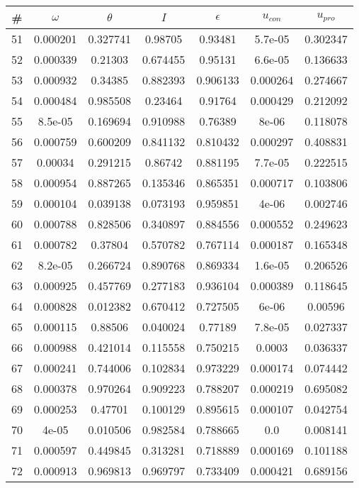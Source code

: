 \newpage
\begin{table}
\begin{tabular}{c|c|c|c|c|c|c}
\# & $\omega$ & $\theta$ & $I$ & $\epsilon$ & $u_{con}$ & $u_{pro}$\\
\hline
51 & 0.000201 & 0.327741 & 0.98705 & 0.93481 & 5.7e-05 & 0.302347\\
52 & 0.000339 & 0.21303 & 0.674455 & 0.95131 & 6.6e-05 & 0.136633\\
53 & 0.000932 & 0.34385 & 0.882393 & 0.906133 & 0.000264 & 0.274667\\
54 & 0.000484 & 0.985508 & 0.23464 & 0.91764 & 0.000429 & 0.212092\\
55 & 8.5e-05 & 0.169694 & 0.910988 & 0.76389 & 8e-06 & 0.118078\\
56 & 0.000759 & 0.600209 & 0.841132 & 0.810432 & 0.000297 & 0.408831\\
57 & 0.00034 & 0.291215 & 0.86742 & 0.881195 & 7.7e-05 & 0.222515\\
58 & 0.000954 & 0.887265 & 0.135346 & 0.865351 & 0.000717 & 0.103806\\
59 & 0.000104 & 0.039138 & 0.073193 & 0.959851 & 4e-06 & 0.002746\\
60 & 0.000788 & 0.828506 & 0.340897 & 0.884556 & 0.000552 & 0.249623\\
61 & 0.000782 & 0.37804 & 0.570782 & 0.767114 & 0.000187 & 0.165348\\
62 & 8.2e-05 & 0.266724 & 0.890768 & 0.869334 & 1.6e-05 & 0.206526\\
63 & 0.000925 & 0.457769 & 0.277183 & 0.936104 & 0.000389 & 0.118645\\
64 & 0.000828 & 0.012382 & 0.670412 & 0.727505 & 6e-06 & 0.00596\\
65 & 0.000115 & 0.88506 & 0.040024 & 0.77189 & 7.8e-05 & 0.027337\\
66 & 0.000988 & 0.421014 & 0.115558 & 0.750215 & 0.0003 & 0.036337\\
67 & 0.000241 & 0.744006 & 0.102834 & 0.973229 & 0.000174 & 0.074442\\
68 & 0.000378 & 0.970264 & 0.909223 & 0.788207 & 0.000219 & 0.695082\\
69 & 0.000253 & 0.47701 & 0.100129 & 0.895615 & 0.000107 & 0.042754\\
70 & 4e-05 & 0.010506 & 0.982584 & 0.788665 & 0.0 & 0.008141\\
71 & 0.000597 & 0.449845 & 0.313281 & 0.718889 & 0.000169 & 0.101188\\
72 & 0.000913 & 0.969813 & 0.969797 & 0.733409 & 0.000421 & 0.689156\\

\end{tabular}
\end{table}

